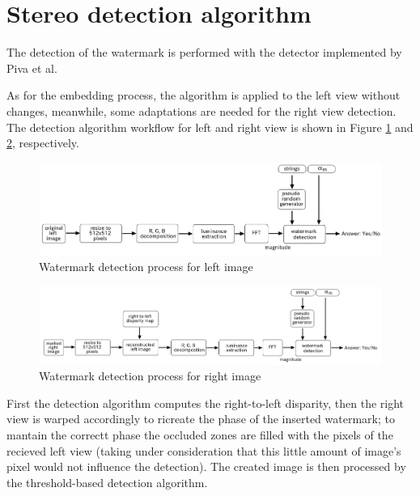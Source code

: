 \section{Stereo detection algorithm}

The detection of the watermark is performed with the detector implemented by Piva et al.\newline

As for the embedding process, the algorithm is applied to the left view without changes, meanwhile, some adaptations are needed for the right view detection. The detection algorithm workflow for left and right view is shown in Figure \ref{fig:left_dec} and \ref{fig:right_dec}, respectively. \newline

\begin{figure}[h!]
\centering
\includegraphics[width=1\textwidth]{./img/left_det.png}
\caption{\small{Watermark detection process for left image}\label{fig:left_dec}}

\end{figure}

\begin{figure}[h!]
\centering
\includegraphics[width=1\textwidth]{./img/right_det.png}
\caption{\small{Watermark detection process for right image}\label{fig:right_dec}}

\end{figure}



First the detection algorithm computes the right-to-left disparity, then the right view is warped accordingly to ricreate the phase of the inserted watermark; to mantain the correctt phase the occluded zones are filled with the pixels of the recieved left view (taking under consideration that this little amount of image's pixel would not influence the detection).\newline
The created image is then processed by the threshold-based detection algorithm.\newline 

